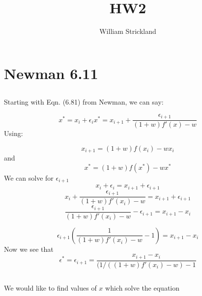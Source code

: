 \documentclass[12pt]{article}
\begin{document}
 
%
%
 
\title{HW2} 
\author{William Strickland}
\maketitle

\section{Newman 6.11}
\renewcommand\thesubsection{a}
\subsection{}
Starting with Eqn. (6.81) from Newman, we can say:

\begin{equation}
x^* = x_i + \epsilon_i
x^* = x_{i+1} + \frac{\epsilon_{i+1}}{(1+w)f'(x)-w}
\end{equation}{}
Using:

\begin{equation}
    x_{i+1} = (1+w)f(x_i)-wx_i
\end{equation}{}
and
\begin{equation}
    x^* = (1+w)f(x^*)-wx^*
\end{equation}
We can solve for $\epsilon_{i+1}$
\begin{equation}
    x_i+\epsilon_i = x_{i+1}+\epsilon_{i+1}
\end{equation}{}
\begin{equation}
    x_i+\frac{\epsilon_{i+1}}{(1+w)f'(x_i)-w} = x_{i+1}+\epsilon_{i+1}
\end{equation}{}
\begin{equation}
        \frac{\epsilon_{i+1}}{(1+w)f'(x_i)-w} - \epsilon_{i+1}= x_{i+1} - x_i
\end{equation}{}

\begin{equation}
        \epsilon_{i+1} \left( \frac{1}{(1+w)f'(x_i)-w} - 1 \right)= x_{i+1} - x_i
\end{equation}{} 
Now we see that
\begin{equation}
        \epsilon^* = \epsilon_{i+1} =  \frac{x_{i+1} - x_i}{(1/((1+w)f'(x_i)-w) - 1}
\end{equation}{} 

\renewcommand\thesubsection{b}
\subsection{}
We would like to find values of $x$ which solve the equation 
\end{document}
